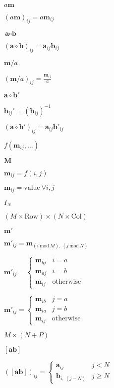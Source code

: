 \documentclass{article}
\begin{document}
{{{$ a\textbf{m} $
\pagebreak

$ \left(a\textbf{m}\right)_{ij} = a\textbf{m}_{ij} $
\pagebreak

$ \textbf{a} \circ \textbf{b} $
\pagebreak

$ \left(\textbf{a} \circ \textbf{b}\right)_{ij} = \textbf{a}_{ij} \textbf{b}_{ij} $
\pagebreak

$ \textbf{m}/a $
\pagebreak

$ \left(\textbf{m}/a\right)_{ij} = \frac{\textbf{m}_{ij}}{a} $
\pagebreak

$ \textbf{a} \circ \textbf{b}' $
\pagebreak

$ {\textbf{b}_{ij}}' = \left(\textbf{b}_{ij}\right)^{-1}$
\pagebreak

$ \left(\textbf{a} \circ \textbf{b}'\right)_{ij} = \textbf{a}_{ij} {\textbf{b}'}_{ij} $
\pagebreak

$ f\left(\textbf{m}_{ij}, \ldots\right) $
\pagebreak

$ \textbf{M} $
\pagebreak

$ \textbf{m}_{ij} = f(i, j) $
\pagebreak

$ \textbf{m}_{ij} = \textrm{value}\ \forall i,j $
\pagebreak

$ I_N $
\pagebreak

$ \left(M\times\textrm{Row}\right) \times \left(N\times\textrm{Col}\right) $
\pagebreak

$ \textbf{m}' $
\pagebreak

$ \textbf{m}'_{ij} = \textbf{m}_{\left(i\ \textrm{mod}\ M\right),\ \left(j\ \textrm{mod}\ N \right)} $
\pagebreak

$ {\textbf{m}'}_{ij} = \begin{cases} \textbf{m}_{bj} & i = a\\ \textbf{m}_{aj} & i = b\\ \textbf{m}_{ij} & \textrm{otherwise} \end{cases} $
\pagebreak

$ {\textbf{m}'}_{ij} = \begin{cases} \textbf{m}_{ib} & j = a\\ \textbf{m}_{ia} & j = b\\ \textbf{m}_{ij} & \textrm{otherwise} \end{cases} $
\pagebreak

$ M \times \left(N+P\right) $
\pagebreak

$ \left[\textbf{a} \textbf{b}\right] $
\pagebreak

$ \left(\left[\textbf{a} \textbf{b}\right]\right)_{ij} = \begin{cases} \textbf{a}_{ij} & j < N\\ \textbf{b}_{i,\ \left(j - N\right)} & j \ge N \end{cases} $
\pagebreak

}}}
\end{document}
